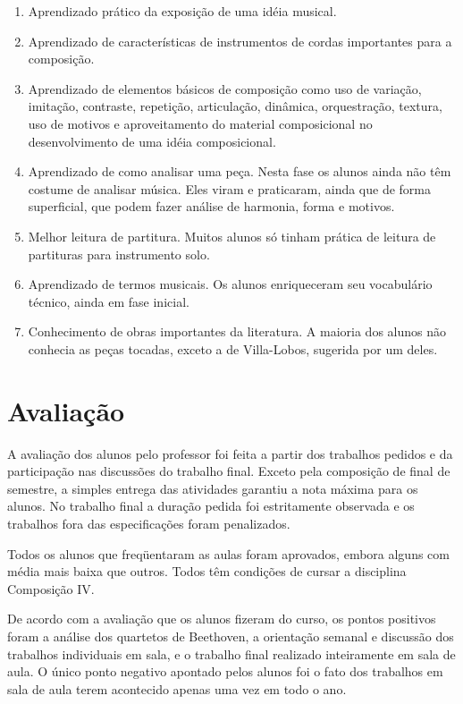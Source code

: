 \documentclass[12pt]{article}
\begin{document}
\begin{enumerate}
\item Aprendizado prático da exposição de uma idéia musical.
\item Aprendizado de características de instrumentos de cordas
  importantes para a composição.
\item Aprendizado de elementos básicos de composição como uso de
  variação, imitação, contraste, repetição, articulação, dinâmica,
  orquestração, textura, uso de motivos e aproveitamento do material
  composicional no desenvolvimento de uma idéia composicional.
\item Aprendizado de como analisar uma peça. Nesta fase os alunos
  ainda não têm costume de analisar música. Eles viram e praticaram,
  ainda que de forma superficial, que podem fazer análise de harmonia,
  forma e motivos.
\item Melhor leitura de partitura. Muitos alunos só tinham prática de
  leitura de partituras para instrumento solo.
\item Aprendizado de termos musicais. Os alunos enriqueceram seu
  vocabulário técnico, ainda em fase inicial.
\item Conhecimento de obras importantes da literatura. A maioria dos
  alunos não conhecia as peças tocadas, exceto a de Villa-Lobos,
  sugerida por um deles.
\end{enumerate}

\section{Avaliação}
\label{sec:avaliacao}

A avaliação dos alunos pelo professor foi feita a partir dos trabalhos
pedidos e da participação nas discussões do trabalho final. Exceto
pela composição de final de semestre, a simples entrega das atividades
garantiu a nota máxima para os alunos. No trabalho final a duração
pedida foi estritamente observada e os trabalhos fora das
especificações foram penalizados.

Todos os alunos que freqüentaram as aulas foram aprovados, embora
alguns com média mais baixa que outros. Todos têm condições de cursar
a disciplina Composição IV.

De acordo com a avaliação que os alunos fizeram do curso, os pontos
positivos foram a análise dos quartetos de Beethoven, a orientação
semanal e discussão dos trabalhos individuais em sala, e o trabalho
final realizado inteiramente em sala de aula. O único ponto negativo
apontado pelos alunos foi o fato dos trabalhos em sala de aula terem
acontecido apenas uma vez em todo o ano.
\end{document}
